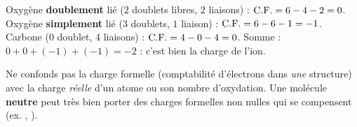 \documentclass[11pt,a4paper]{article}
\begin{document}
\begin{exemplebox}
Oxygène \textbf{doublement} lié ($2$ doublets libres, $2$ liaisons) :
$\mathrm{C.F.} = 6 - 4 - 2 = 0$. \quad
Oxygène \textbf{simplement} lié ($3$ doublets, $1$ liaison) : $\mathrm{C.F.} = 6 - 6 - 1 = -1$. \quad
Carbone ($0$ doublet, $4$ liaisons) : $\mathrm{C.F.} = 4 - 0 - 4 = 0$. \;
Somme : $0 + 0 + (-1) + (-1) = -2$ : c'est bien la charge de l'ion.
\end{exemplebox}

\begin{piege}
Ne confonds pas la charge formelle (comptabilité d'électrons dans \emph{une} structure) avec la
charge \emph{réelle} d'un atome ou son nombre d'oxydation. Une molécule \textbf{neutre} peut très
bien porter des charges formelles non nulles qui se compensent (ex. , ).
\end{piege}
\end{document}

